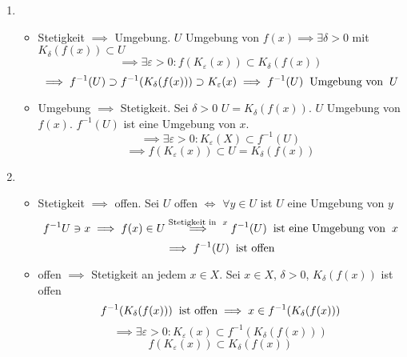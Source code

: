 \begin{Bew}
  \begin{enumerate}
    \item
      \begin{itemize}
        \item Stetigkeit $\implies$ Umgebung.
          $U$ Umgebung von $f(x)\implies \exists \delta>0$ mit $K_\delta(f(x))\subset U$
          \[\implies \exists \varepsilon>0:f(K_\varepsilon(x))\subset K_\delta(f(x))\]
          \[\implies f^{-1}(U)\supset f^{-1}(K_\delta(f(x)))\supset K_\varepsilon(x)\implies f^{-1}(U)\hspace{2mm}\text{Umgebung von}\hspace{2mm} U\]
        \item Umgebung $\implies$ Stetigkeit. Sei $\delta>0$ $U=K_\delta(f(x))$. $U$ Umgebung von $f(x)$. $f^{-1}(U)$ ist eine Umgebung von $x$.
          \[\implies \exists\varepsilon>0:K_\varepsilon(X)\subset f^{-1}(U)\]
          \[\implies f(K_\varepsilon(x))\subset U=K_\delta(f(x))\]
      \end{itemize}
    \item
      \begin{itemize}
        \item 
          Stetigkeit $\implies$ offen. Sei $U$ offen $\iff$ $\forall y\in U$ ist $U$ eine Umgebung von $y$
          \[f^{-1}U\ni x\implies f(x)\in U\stackrel{\text{Stetigkeit in}\hspace{2mm} x}{\implies} f^{-1}(U)\hspace{2mm}\text{ist eine Umgebung von}\hspace{2mm} x\]
          \[\implies f^{-1}(U)\hspace{2mm}\text{ist offen}\]
        \item offen $\implies$ Stetigkeit an jedem $x\in X$. Sei $x\in X$, $\delta>0$, $K_\delta(f(x))$ ist offen
          \[f^{-1}(K_\delta(f(x)))\hspace{2mm}\text{ist offen}\implies x\in f^{-1}(K_\delta(f(x)))\]
          \[\implies \exists \varepsilon>0: K_\varepsilon(x)\subset f^{-1}(K_\delta(f(x)))\]
          \[f(K_\varepsilon(x))\subset K_\delta(f(x))\]
      \end{itemize}
  \end{enumerate}
\end{Bew}
